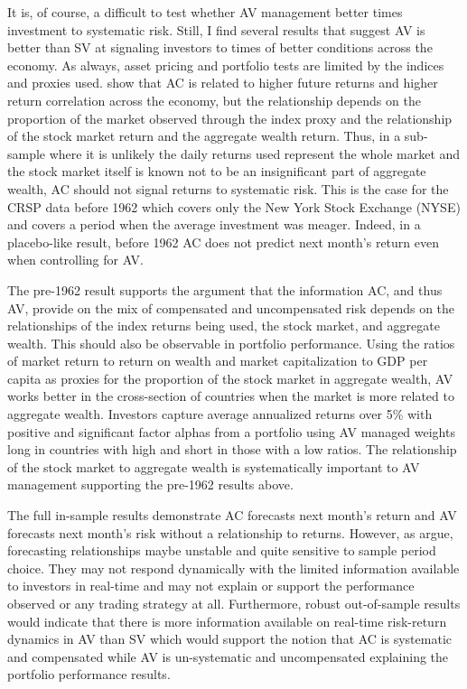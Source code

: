 It is, of course, a difficult to test whether AV management better times investment to systematic risk. Still, I find several results that suggest AV is better than SV at signaling investors to times of better conditions across the economy. As always, asset pricing and portfolio tests are limited by the indices and proxies used. \citet{pollet_average_2010} show that AC is related to higher future returns and higher return correlation across the economy, but the relationship depends on the proportion of the market observed through the index proxy and the relationship of the stock market return and the aggregate wealth return. Thus, in a sub-sample where it is unlikely the daily returns used represent the whole market and the stock market itself is known not to be an insignificant part of aggregate wealth, AC should not signal returns to systematic risk. This is the case for the CRSP data before 1962 which covers only the New York Stock Exchange (NYSE) and covers a period when the average investment was meager. \citep{taylor_2014} Indeed, in a placebo-like result, before 1962 AC does not predict next month's return even when controlling for AV.

The pre-1962 result supports the \citet{pollet_average_2010} argument that the information AC, and thus AV, provide on the mix of compensated and uncompensated risk depends on the relationships of the index returns being used, the stock market, and aggregate wealth. This should also be observable in portfolio performance. Using the ratios of market return to return on wealth and market capitalization to GDP per capita as proxies for the proportion of the stock market in aggregate wealth, AV works better in the cross-section of countries when the market is more related to aggregate wealth. Investors capture average annualized returns over 5\% with positive and significant factor alphas from a portfolio using AV managed weights long in countries with high and short in those with a low ratios. The relationship of the stock market to aggregate wealth is systematically important to AV management supporting the pre-1962 results above.

The full in-sample results demonstrate AC forecasts next month's return and AV forecasts next month's risk without a relationship to returns. However, as \citet{Welch2008} argue, forecasting relationships maybe unstable and quite sensitive to sample period choice. They may not respond dynamically with the limited information available to investors in real-time and may not explain or support the performance observed or any trading strategy at all. Furthermore, robust out-of-sample results would indicate that there is more information available on real-time risk-return dynamics in AV than SV which would support the notion that AC is systematic and compensated while AV is un-systematic and uncompensated explaining the portfolio performance results.


